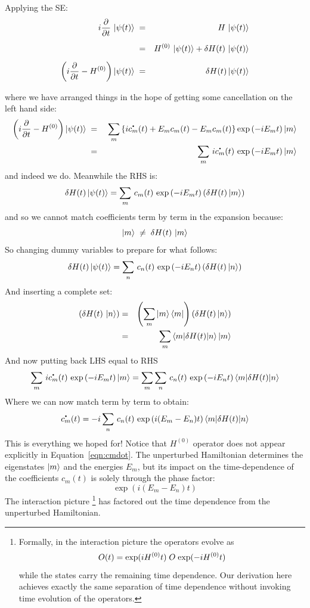 \documentclass[12pt]{article}
\newcommand*{\dt}[1]{%
  \accentset{\mbox{\large\bfseries .}}{#1}}
\begin{document}
Applying the SE:
\begin{eqnarray*}
  i \frac{\partial}{\partial t} \, \ket{\psi(t)} \; &=& \; H \, \ket{\psi(t)} \\[5pt]
  &=& H^{(0)} \, \ket{\psi(t)} + \delta H(t) \, \ket{\psi(t)} \\[5pt]
\left( i \frac{\partial}{\partial t} -  H^{(0)}\right) \ket{\psi(t)} \; &=& \; \delta H(t) \ket{\psi(t)} \\[5pt]
\end{eqnarray*}
where we have arranged things in the hope of getting some cancellation on the left hand side:
\begin{eqnarray*}
\left( i \frac{\partial}{\partial t} -  H^{(0)}\right) \ket{\psi(t)} \; &=& \;
\sum_m \left\{ i \dt{c_m}(t) + E_m c_m(t) - E_m c_m(t) \right\} \exp\left( -i E_m t \right) \ket{m} \\
  &=&
\sum_m \, i \dt{c_m}(t)  \, \exp\left( -i E_m t \right) \ket{m}
\end{eqnarray*}
and indeed we do.  Meanwhile the RHS is:
$$\delta H(t) \ket{\psi(t)} = \sum_m \, c_m(t)  \, \exp\left( -i E_m t \right)
\left(\delta H(t) \ket{m}\right)$$
and so we cannot match coefficients term by term in the expansion because:
$$\ket{m} \; \neq \; \delta H(t) \, \ket{m} $$
So changing dummy variables to prepare for what follows:
$$\delta H(t) \ket{\psi(t)} = \sum_n \, c_n(t)  \, \exp\left( -i E_n t \right)
\left(\delta H(t) \ket{n}\right)$$
And inserting a complete set:
\begin{eqnarray*}
\left( \delta H(t) \, \ket{n} \right) &=& \left( \sum_m \ket{m}\bra{m} \right) \left( \delta H(t) \ket{n} \right) \\
&=& \sum_m  \braket{m | \delta H(t) | n} \ket{m}
\end{eqnarray*}
And now putting back LHS equal to RHS
$$
\sum_m \, i \dt{c_m}(t)  \, \exp\left( -i E_m t \right) \ket{m}
= \sum_m \sum_n \, c_n(t)  \, \exp\left( -i E_n t \right)
\braket{m | \delta H(t) | n}
$$
Where we can now match term by term to obtain:
\begin{equation}
\label{eqn:cmdot}
\dt{c_m}(t)  = -i \sum_n \, c_n(t)  \, \exp\left( i (E_m - E_n) t \right)
\braket{m | \delta H(t) | n}
\end{equation}
This is everything we hoped for!  Notice that $H^{(0)}$ operator does
not appear explicitly in Equation~\ref{eqn:cmdot}.  The unperturbed
Hamiltonian determines the eigenstates $\ket{m}$ and the energies
$E_m$, but its impact on the time-dependence of the coefficients
$c_m(t)$ is solely through the phase factor:
$$\exp\left( i (E_m - E_n) t \right)$$
The interaction picture
\footnote{Formally, in the interaction picture the operators evolve as
$$O(t) = {\rm exp}(iH^{(0)}t) \; O \; {\rm exp}(-iH^{(0)}t)$$
while the states carry the remaining time dependence.  Our derivation
here achieves exactly the same separation of time dependence without
invoking time evolution of the operators.}  has factored out the time
  dependence from the unperturbed Hamiltonian.
\end{document}
